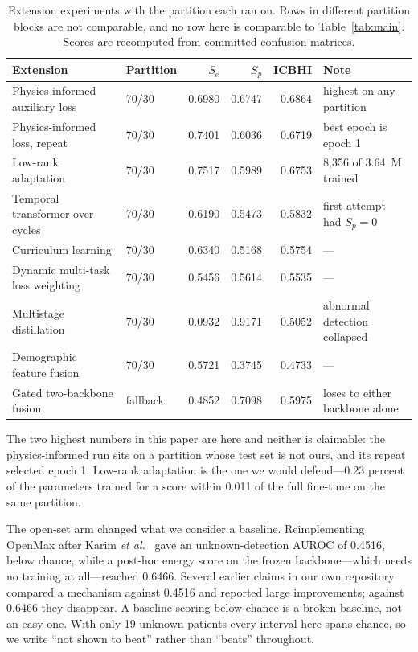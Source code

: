 \documentclass[journal,onecolumn]{IEEEtran}
\begin{document}
\begin{table}[!t]
\centering
\caption{Extension experiments with the partition each ran on. Rows in different partition
blocks are not comparable, and no row here is comparable to Table~\ref{tab:main}. Scores are
recomputed from committed confusion matrices.}
\label{tab:extensions}
\footnotesize
\begin{tabular}{llrrrl}
\toprule
Extension & Partition & $S_e$ & $S_p$ & ICBHI & Note \\
\midrule
Physics-informed auxiliary loss & 70/30 & 0.6980 & 0.6747 & 0.6864 & highest on any partition \\
Physics-informed loss, repeat & 70/30 & 0.7401 & 0.6036 & 0.6719 & best epoch is epoch 1 \\
Low-rank adaptation~\cite{hu2022lora} & 70/30 & 0.7517 & 0.5989 & 0.6753 & 8{,}356 of 3.64~M trained \\
Temporal transformer over cycles & 70/30 & 0.6190 & 0.5473 & 0.5832 & first attempt had $S_p = 0$ \\
Curriculum learning & 70/30 & 0.6340 & 0.5168 & 0.5754 & --- \\
Dynamic multi-task loss weighting & 70/30 & 0.5456 & 0.5614 & 0.5535 & --- \\
Multistage distillation~\cite{pavel2024kd} & 70/30 & 0.0932 & 0.9171 & 0.5052 & abnormal detection collapsed \\
Demographic feature fusion & 70/30 & 0.5721 & 0.3745 & 0.4733 & --- \\
Gated two-backbone fusion & fallback & 0.4852 & 0.7098 & 0.5975 & loses to either backbone alone \\
\bottomrule
\end{tabular}

\vspace{2pt}
\footnotesize The two highest numbers in this paper are here and neither is claimable: the
physics-informed run sits on a partition whose test set is not ours, and its repeat selected
epoch 1. Low-rank adaptation is the one we would defend---0.23 percent of the parameters
trained for a score within 0.011 of the full fine-tune on the same partition.
\end{table}

The open-set arm changed what we consider a baseline. Reimplementing OpenMax after Karim
\emph{et al.}~\cite{karim2024mosquito} gave an unknown-detection AUROC of 0.4516, below chance,
while a post-hoc energy score on the frozen backbone---which needs no training at all---reached
0.6466. Several earlier claims in our own repository compared a mechanism against 0.4516 and
reported large improvements; against 0.6466 they disappear. A baseline scoring below chance is a
broken baseline, not an easy one. With only 19 unknown patients every interval here spans
chance, so we write ``not shown to beat'' rather than ``beats'' throughout.
\end{document}
